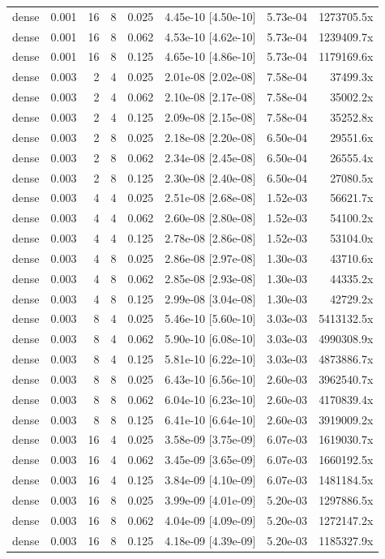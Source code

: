 \begin{tabular}{lrrrrrrr}
dense & 0.001 & 16 & 8 & 0.025 & 4.45e-10 [4.50e-10] & 5.73e-04 & 1273705.5x \\
dense & 0.001 & 16 & 8 & 0.062 & 4.53e-10 [4.62e-10] & 5.73e-04 & 1239409.7x \\
dense & 0.001 & 16 & 8 & 0.125 & 4.65e-10 [4.86e-10] & 5.73e-04 & 1179169.6x \\
dense & 0.003 & 2 & 4 & 0.025 & 2.01e-08 [2.02e-08] & 7.58e-04 & 37499.3x \\
dense & 0.003 & 2 & 4 & 0.062 & 2.10e-08 [2.17e-08] & 7.58e-04 & 35002.2x \\
dense & 0.003 & 2 & 4 & 0.125 & 2.09e-08 [2.15e-08] & 7.58e-04 & 35252.8x \\
dense & 0.003 & 2 & 8 & 0.025 & 2.18e-08 [2.20e-08] & 6.50e-04 & 29551.6x \\
dense & 0.003 & 2 & 8 & 0.062 & 2.34e-08 [2.45e-08] & 6.50e-04 & 26555.4x \\
dense & 0.003 & 2 & 8 & 0.125 & 2.30e-08 [2.40e-08] & 6.50e-04 & 27080.5x \\
dense & 0.003 & 4 & 4 & 0.025 & 2.51e-08 [2.68e-08] & 1.52e-03 & 56621.7x \\
dense & 0.003 & 4 & 4 & 0.062 & 2.60e-08 [2.80e-08] & 1.52e-03 & 54100.2x \\
dense & 0.003 & 4 & 4 & 0.125 & 2.78e-08 [2.86e-08] & 1.52e-03 & 53104.0x \\
dense & 0.003 & 4 & 8 & 0.025 & 2.86e-08 [2.97e-08] & 1.30e-03 & 43710.6x \\
dense & 0.003 & 4 & 8 & 0.062 & 2.85e-08 [2.93e-08] & 1.30e-03 & 44335.2x \\
dense & 0.003 & 4 & 8 & 0.125 & 2.99e-08 [3.04e-08] & 1.30e-03 & 42729.2x \\
dense & 0.003 & 8 & 4 & 0.025 & 5.46e-10 [5.60e-10] & 3.03e-03 & 5413132.5x \\
dense & 0.003 & 8 & 4 & 0.062 & 5.90e-10 [6.08e-10] & 3.03e-03 & 4990308.9x \\
dense & 0.003 & 8 & 4 & 0.125 & 5.81e-10 [6.22e-10] & 3.03e-03 & 4873886.7x \\
dense & 0.003 & 8 & 8 & 0.025 & 6.43e-10 [6.56e-10] & 2.60e-03 & 3962540.7x \\
dense & 0.003 & 8 & 8 & 0.062 & 6.04e-10 [6.23e-10] & 2.60e-03 & 4170839.4x \\
dense & 0.003 & 8 & 8 & 0.125 & 6.41e-10 [6.64e-10] & 2.60e-03 & 3919009.2x \\
dense & 0.003 & 16 & 4 & 0.025 & 3.58e-09 [3.75e-09] & 6.07e-03 & 1619030.7x \\
dense & 0.003 & 16 & 4 & 0.062 & 3.45e-09 [3.65e-09] & 6.07e-03 & 1660192.5x \\
dense & 0.003 & 16 & 4 & 0.125 & 3.84e-09 [4.10e-09] & 6.07e-03 & 1481184.5x \\
dense & 0.003 & 16 & 8 & 0.025 & 3.99e-09 [4.01e-09] & 5.20e-03 & 1297886.5x \\
dense & 0.003 & 16 & 8 & 0.062 & 4.04e-09 [4.09e-09] & 5.20e-03 & 1272147.2x \\
dense & 0.003 & 16 & 8 & 0.125 & 4.18e-09 [4.39e-09] & 5.20e-03 & 1185327.9x \\
\bottomrule
\end{tabular}\hspace{2em}%
